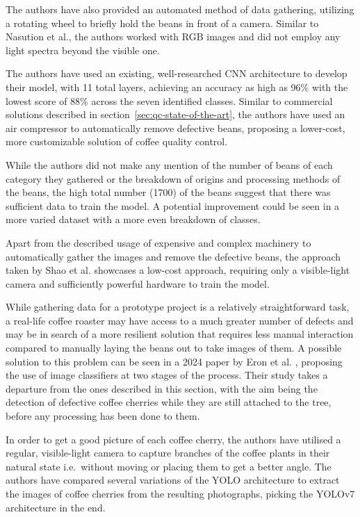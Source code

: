 The authors have also provided an automated method of data gathering, utilizing a
rotating wheel to briefly hold the beans in front of a camera.
Similar to
Nasution et al.\cite{manyRoastLevelsNasution}, the authors worked with RGB images
and did not employ any light spectra beyond the visible one.

The authors have used an existing, well-researched CNN architecture to develop
their model, with 11 total layers, achieving an accuracy as high as 96\% with the
lowest score of 88\% across the seven identified classes.
Similar to commercial solutions
described in section~\ref{sec:qc-state-of-the-art}, the authors have used an air
compressor to automatically remove defective beans, proposing a lower-cost, more
customizable solution of coffee quality control.

While the authors did not make any mention of the number of beans of each
category they gathered or the breakdown of origins and processing methods of the
beans, the high total number (1700) of the beans suggest that there was sufficient
data to train the model.
A potential improvement could be seen in a more varied
dataset with a more even breakdown of classes.

Apart from the described usage of expensive and complex machinery to %
automatically gather the images and remove the defective beans, the approach taken
by Shao et al.\cite{rgbDeepLearningShao} showcases a low-cost approach, requiring only a visible-light camera
and sufficiently powerful hardware to train the model.

While gathering data for a prototype project is a relatively straightforward task,
a real-life coffee roaster may have access to a much greater number of defects
and may be in search of a more resilient solution that requires less manual
interaction compared to manually laying the beans out to take images of them.
A possible
solution to this problem can be seen in a 2024 paper by Eron et al.
\cite{eronCoffeeCherryOnTrees}, proposing the use of image classifiers at two stages %
of the process.
Their study takes a departure from the ones described in this
section, with the aim being the detection of defective coffee cherries while they
are still attached to the tree, before any processing has been done to them.

In order to get a good picture of each coffee cherry, the authors have utilised a
regular, visible-light camera to capture branches of the coffee plants in their
natural state i.e.\ without moving or placing them to get a better angle.
The
authors have compared several variations of the YOLO architecture to extract the
images of coffee cherries from the resulting photographs, picking the YOLOv7 architecture
in the end.

